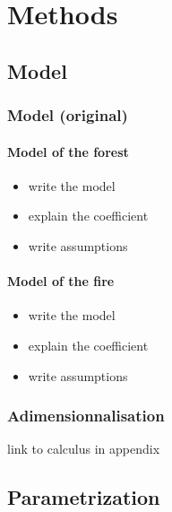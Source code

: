 \documentclass{article}
\begin{document}
\section{Methods}


\subsection{Model}

\subsubsection{Model (original)}

\paragraph{Model of the forest}

\begin{itemize}
    \item write the model 
    \item explain the coefficient
    \item write assumptions
\end{itemize}

\paragraph{Model of the fire}

\begin{itemize}
    \item write the model
    \item explain the coefficient
    \item write assumptions
\end{itemize}


\subsubsection{Adimensionnalisation}


link to calculus in appendix    





\subsection{Parametrization}
\end{document}
